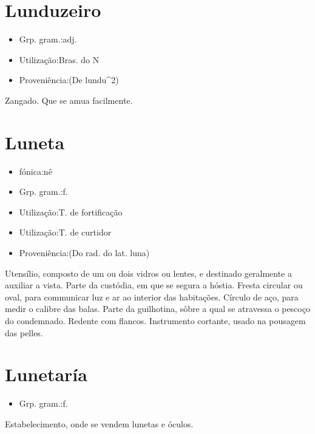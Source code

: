 \section{Lunduzeiro}
\begin{itemize}
\item {Grp. gram.:adj.}
\end{itemize}
\begin{itemize}
\item {Utilização:Bras. do N}
\end{itemize}
\begin{itemize}
\item {Proveniência:(De \textunderscore lundu\textunderscore ^2)}
\end{itemize}
Zangado.
Que se amua facilmente.
\section{Luneta}
\begin{itemize}
\item {fónica:nê}
\end{itemize}
\begin{itemize}
\item {Grp. gram.:f.}
\end{itemize}
\begin{itemize}
\item {Utilização:T. de fortificação}
\end{itemize}
\begin{itemize}
\item {Utilização:T. de curtidor}
\end{itemize}
\begin{itemize}
\item {Proveniência:(Do rad. do lat. \textunderscore luna\textunderscore )}
\end{itemize}
Utensílio, composto de um ou dois vidros ou lentes, e destinado geralmente a auxiliar a vista.
Parte da custódia, em que se segura a hóstia.
Fresta circular ou oval, para communicar luz e ar ao interior das habitações.
Círculo de aço, para medir o calibre das balas.
Parte da guilhotina, sôbre a qual se atravessa o pescoço do condemnado.
Redente com flancos.
Instrumento cortante, usado na pousagem das pelles.
\section{Lunetaría}
\begin{itemize}
\item {Grp. gram.:f.}
\end{itemize}
Estabelecimento, onde se vendem lunetas e óculos.
